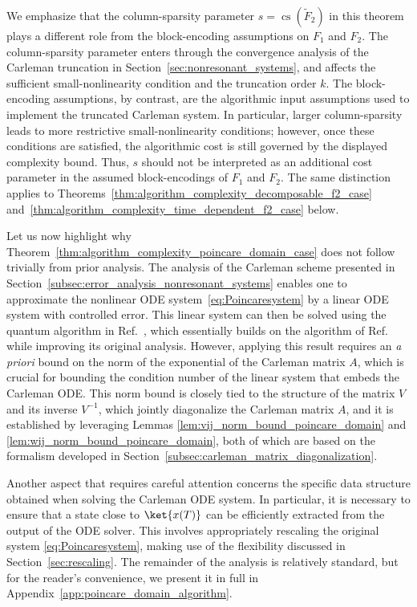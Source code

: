 \documentclass[superscriptaddress,onecolumn,nofootinbib,longbibliography,a4paper,accepted=2026-09-29]{quantumarticle}
\theoremstyle{plain}
\theoremstyle{definition}
\numberwithin{thm}{section}
\numberwithin{assumption}{section}
\numberwithin{lemma}{section}
\numberwithin{prop}{section}
\numberwithin{cor}{section}
\numberwithin{definition}{section}
\numberwithin{rmk}{section}
\numberwithin{equation}{section}
\begin{document}
We emphasize that the column-sparsity parameter $s=\operatorname{cs}(\tilde{F}_2)$ in this theorem plays a different role from the block-encoding assumptions on $F_1$ and $F_2$. The column-sparsity parameter enters through the convergence analysis of the Carleman truncation in Section~\ref{sec:nonresonant_systems}, and affects the sufficient small-nonlinearity condition and the truncation order $k$. The block-encoding assumptions, by contrast, are the algorithmic input assumptions used to implement the truncated Carleman system. In particular, larger column-sparsity leads to more restrictive small-nonlinearity conditions; however, once these conditions are satisfied, the algorithmic cost is still governed by the displayed complexity bound. Thus, $s$ should not be interpreted as an additional cost parameter in the assumed block-encodings of $F_1$ and $F_2$. The same distinction applies to Theorems~\ref{thm:algorithm_complexity_decomposable_f2_case} and~\ref{thm:algorithm_complexity_time_dependent_f2_case} below.


Let us now highlight why Theorem~\ref{thm:algorithm_complexity_poincare_domain_case} does not follow trivially from prior analysis. The analysis of the Carleman scheme presented in Section~\ref{subsec:error_analysis_nonresonant_systems} enables one to approximate the nonlinear ODE system~\eqref{eq:Poincaresystem} by a linear ODE system with controlled error. This linear system can then be solved using the quantum algorithm in Ref.~\cite{jennings2023cost}, which essentially builds on the algorithm of Ref.~\cite{berry2017quantum} while improving its original analysis. However, applying this result requires an \emph{a priori} bound on the norm of the exponential of the Carleman matrix $A$, which is crucial for bounding the condition number of the linear system that embeds the Carleman ODE. This norm bound is closely tied to the structure of the matrix $V$ and its inverse $V^{-1}$, which jointly diagonalize the Carleman matrix $A$, and it is established by leveraging Lemmas \ref{lem:vij_norm_bound_poincare_domain} and \ref{lem:wij_norm_bound_poincare_domain}, both of which are based on the formalism developed in Section~\ref{subsec:carleman_matrix_diagonalization}.

Another aspect that requires careful attention concerns the specific data structure obtained when solving the Carleman ODE system. In particular, it is necessary to ensure that a state close to $\ket{x(T)}$ can be efficiently extracted from the output of the ODE solver. This involves appropriately rescaling the original system \eqref{eq:Poincaresystem}, making use of the flexibility discussed in Section~\ref{sec:rescaling}. The remainder of the analysis is relatively standard, but for the reader’s convenience, we present it in full in Appendix~\ref{app:poincare_domain_algorithm}.
\end{document}
